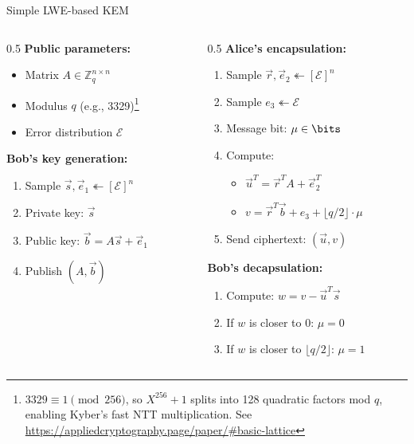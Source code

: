 \ifdefined\PRESENTATION\else\PassOptionsToClass{handout}{beamer}\fi\documentclass[aspectratio=169, lualatex]{beamer}
\begin{document}
\begin{frame}{Simple LWE-based KEM}
	\vspace{-1.5mm}
	\begin{columns}[c]
		\begin{column}{0.5\textwidth}
			\textbf{Public parameters:}
			\begin{itemize}
				\item Matrix $A \in \mathbb{Z}_q^{n \times n}$
				\item Modulus $q$ (e.g., 3329)\footnote{$3329 \equiv 1 \pmod{256}$, so $X^{256} + 1$ splits into 128 quadratic factors mod $q$, enabling Kyber's fast NTT multiplication. See \url{https://appliedcryptography.page/paper/\#basic-lattice}}
				\item Error distribution $\mathcal{E}$
			\end{itemize}
			\textbf{Bob's key generation:}
			\begin{enumerate}
				\item Sample $\vec{s}, \vec{e}_1 \twoheadleftarrow [\mathcal{E}]^n$
				\item Private key: $\vec{s}$
				\item Public key: $\vec{b} = A\vec{s} + \vec{e}_1$
				\item Publish $(A, \vec{b})$
			\end{enumerate}
		\end{column}
		\begin{column}{0.5\textwidth}
			\textbf{Alice's encapsulation:}
			\begin{enumerate}
				\item Sample $\vec{r}, \vec{e}_2 \twoheadleftarrow [\mathcal{E}]^n$
				\item Sample $e_3 \twoheadleftarrow \mathcal{E}$
				\item Message bit: $\mu \in \bits$
				\item Compute:
				      \begin{itemize}
					      \item $\vec{u}^T = \vec{r}^{T}A + \vec{e}_{2}^{T}$
					      \item $v = \vec{r}^T\vec{b} + e_3 + \lfloor q/2 \rfloor \cdot \mu$
				      \end{itemize}
				\item Send ciphertext: $(\vec{u}, v)$
			\end{enumerate}
			\textbf{Bob's decapsulation:}
			\begin{enumerate}
				\item Compute: $w = v - \vec{u}^{T}\vec{s}$
				\item If $w$ is closer to 0: $\mu = 0$
				\item If $w$ is closer to $\lfloor q/2 \rfloor$: $\mu = 1$
			\end{enumerate}
		\end{column}
	\end{columns}
\end{frame}
\end{document}
